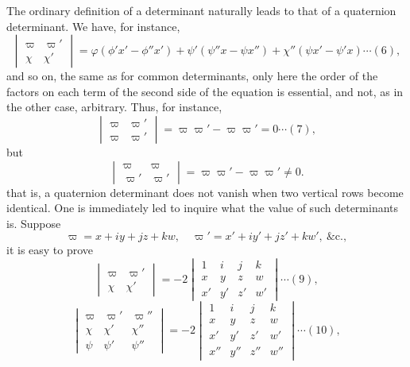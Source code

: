 \documentclass[12pt,a4paper]{article}
\begin{document}
The ordinary definition of a determinant naturally leads to that of a quaternion
determinant. We have, for instance,
\begin{equation}
\begin{vmatrix}
\varpi & \varpi' \\
\chi & \chi'
\end{vmatrix}
= \varphi(\phi'x' - \phi''x') + \psi'(\psi''x - \psi x'') + \chi''(\psi x' - \psi'x) \cdots (6),
\end{equation}
and so on, the same as for common determinants, only here the order of the factors on each
term of the second side of the equation is essential, and not, as in the other case,
arbitrary. Thus, for instance,
\begin{equation}
\begin{vmatrix}
\varpi & \varpi' \\
\varpi & \varpi'
\end{vmatrix}
= \varpi\varpi' - \varpi\varpi' = 0 \cdots (7),
\end{equation}
but
\[
\begin{vmatrix}
\varpi & \varpi \\
\varpi' & \varpi'
\end{vmatrix}
= \varpi\varpi' - \varpi\varpi' \neq 0.
\]
that is, a quaternion determinant does not vanish when two vertical rows become
identical. One is immediately led to inquire what the value of such determinants is.
Suppose
\[
\varpi = x + iy + jz + kw,\quad \varpi' = x' + iy' + jz' + kw',\ \&\text{c.},
\]
it is easy to prove
\begin{equation}
\begin{vmatrix}
\varpi & \varpi' \\
\chi & \chi'
\end{vmatrix}
= -2 \begin{vmatrix}
1 & i & j & k \\
x & y & z & w \\
x' & y' & z' & w'
\end{vmatrix} \cdots (9),
\end{equation}
\begin{equation}
\begin{vmatrix}
\varpi & \varpi' & \varpi'' \\
\chi & \chi' & \chi'' \\
\psi & \psi' & \psi''
\end{vmatrix}
= -2 \begin{vmatrix}
1 & i & j & k \\
x & y & z & w \\
x' & y' & z' & w' \\
x'' & y'' & z'' & w''
\end{vmatrix} \cdots (10),
\end{equation}
\end{document}
